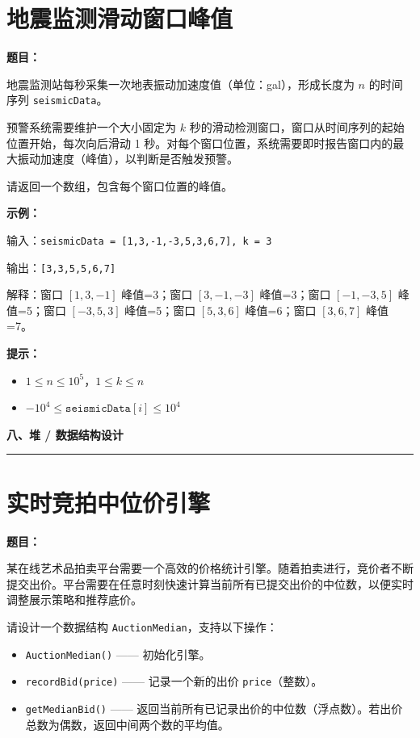 \documentclass[12pt, a4paper]{article}
\newcommand{\category}[1]{%
  \vspace{1.2cm}
  {\noindent\Large\bfseries #1}
  \vspace{0.2em}\par
  \noindent\rule{\textwidth}{0.8pt}
  \vspace{0.2em}
}
\begin{document}
\section{地震监测滑动窗口峰值}

\noindent\textbf{题目：}

地震监测站每秒采集一次地表振动加速度值（单位：gal），形成长度为 $n$ 的时间序列 \texttt{seismicData}。

预警系统需要维护一个大小固定为 $k$ 秒的滑动检测窗口，窗口从时间序列的起始位置开始，每次向后滑动 1 秒。对每个窗口位置，系统需要即时报告窗口内的最大振动加速度（峰值），以判断是否触发预警。

请返回一个数组，包含每个窗口位置的峰值。

\textbf{示例：}

输入：\texttt{seismicData = [1,3,-1,-3,5,3,6,7], k = 3}

输出：\texttt{[3,3,5,5,6,7]}

解释：窗口 $[1,3,-1]$ 峰值=3；窗口 $[3,-1,-3]$ 峰值=3；窗口 $[-1,-3,5]$ 峰值=5；窗口 $[-3,5,3]$ 峰值=5；窗口 $[5,3,6]$ 峰值=6；窗口 $[3,6,7]$ 峰值=7。

\textbf{提示：}
\begin{itemize}[leftmargin=2em]
  \item $1 \leq n \leq 10^5$，$1 \leq k \leq n$
  \item $-10^4 \leq \texttt{seismicData}[i] \leq 10^4$
\end{itemize}



\category{八、堆 / 数据结构设计}

\section{实时竞拍中位价引擎}

\noindent\textbf{题目：}

某在线艺术品拍卖平台需要一个高效的价格统计引擎。随着拍卖进行，竞价者不断提交出价。平台需要在任意时刻快速计算当前所有已提交出价的中位数，以便实时调整展示策略和推荐底价。

请设计一个数据结构 \texttt{AuctionMedian}，支持以下操作：
\begin{itemize}[leftmargin=2em]
  \item \texttt{AuctionMedian()} —— 初始化引擎。
  \item \texttt{recordBid(price)} —— 记录一个新的出价 \texttt{price}（整数）。
  \item \texttt{getMedianBid()} —— 返回当前所有已记录出价的中位数（浮点数）。若出价总数为偶数，返回中间两个数的平均值。
\end{itemize}
\end{document}
